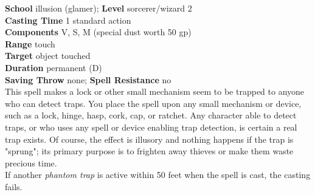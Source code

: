 \textbf{School} illusion (glamer); \textbf{Level} sorcerer/wizard 2\\
\textbf{Casting Time} 1 standard action\\
\textbf{Components} V, S, M (special dust worth 50 gp)\\
\textbf{Range} touch\\
\textbf{Target} object touched\\
\textbf{Duration} permanent (D)\\
\textbf{Saving Throw} none; \textbf{Spell Resistance} no\\
This spell makes a lock or other small mechanism seem to be trapped to anyone who can detect traps. You place the spell upon any small mechanism or device, such as a lock, hinge, hasp, cork, cap, or ratchet. Any character able to detect traps, or who uses any spell or device enabling trap detection, is certain a real trap exists. Of course, the effect is illusory and nothing happens if the trap is "sprung"; its primary purpose is to frighten away thieves or make them waste precious time.\\
If another \textit{phantom trap }is active within 50 feet when the spell is cast, the casting fails.\\
